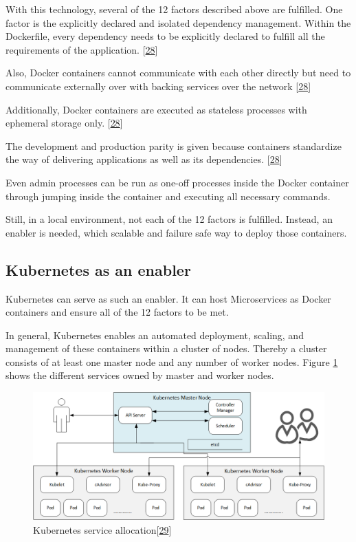 \documentclass[12pt,english,a4paper,oneside,,tablecaptionabove]{scrbook}
\begin{document}
With this technology, several of the 12 factors described above are
fulfilled. One factor is the explicitly declared and isolated dependency
management. Within the Dockerfile, every dependency needs to be
explicitly declared to fulfill all the requirements of the application.
{[}\protect\hyperlink{ref-NoahZoschke}{28}{]}

Also, Docker containers cannot communicate with each other directly but
need to communicate externally over with backing services over the
network {[}\protect\hyperlink{ref-NoahZoschke}{28}{]}

Additionally, Docker containers are executed as stateless processes with
ephemeral storage only. {[}\protect\hyperlink{ref-NoahZoschke}{28}{]}

The development and production parity is given because containers
standardize the way of delivering applications as well as its
dependencies. {[}\protect\hyperlink{ref-NoahZoschke}{28}{]}

Even admin processes can be run as one-off processes inside the Docker
container through jumping inside the container and executing all
necessary commands.

Still, in a local environment, not each of the 12 factors is fulfilled.
Instead, an enabler is needed, which scalable and failure safe way to
deploy those containers.

\hypertarget{kubernetes-as-an-enabler}{%
\subsection{Kubernetes as an enabler}\label{kubernetes-as-an-enabler}}

Kubernetes can serve as such an enabler. It can host Microservices as
Docker containers and ensure all of the 12 factors to be met.

In general, Kubernetes enables an automated deployment, scaling, and
management of these containers within a cluster of nodes. Thereby a
cluster consists of at least one master node and any number of worker
nodes. Figure \ref{fig:kubernetes_services} shows the different services
owned by master and worker nodes.

\begin{figure}
\hypertarget{fig:kubernetes_services}{%
\centering
\includegraphics[width=5.20833in,height=\textheight]{images/chapter2/kubernetes.png}
\caption{Kubernetes service
allocation{[}\protect\hyperlink{ref-Fricke}{29}{]}}\label{fig:kubernetes_services}
}
\end{figure}
\end{document}
